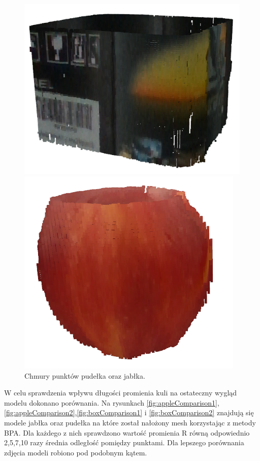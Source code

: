 \begin{figure}[H]
\centering
    \begin{minipage}[b]{0.45\linewidth}
        \includegraphics[scale=0.6]{pudelkoPointcloud.PNG}
    \end{minipage}
\quad
    \begin{minipage}[b]{0.45\linewidth}
        \includegraphics[scale=0.6]{jablkoPointcloud.PNG}

    \end{minipage}
\caption{Chmury punktów pudełka oraz jabłka.}
\label{fig:pointCloudFig}
\end{figure}

W celu sprawdzenia wpływu długości promienia kuli na ostateczny wygląd modelu dokonano porównania. Na rysunkach \ref{fig:appleComparison1},\ref{fig:appleComparison2},\ref{fig:boxComparison1} i \ref{fig:boxComparison2} znajdują się modele jabłka oraz pudełka na które został nałożony mesh korzystając z metody BPA. Dla każdego z nich sprawdzono wartość promienia R równą odpowiednio 2,5,7,10 razy średnia odległość pomiędzy punktami. Dla lepszego porównania zdjęcia modeli robiono pod podobnym kątem.


